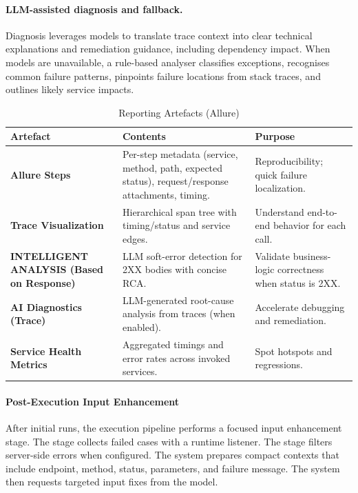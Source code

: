 \documentclass[conference]{IEEEtran}
\begin{document}
\paragraph{LLM-assisted diagnosis and fallback.}
Diagnosis leverages models to translate trace context into clear technical explanations and remediation guidance, including dependency impact. When models are unavailable, a rule-based analyser classifies exceptions, recognises common failure patterns, pinpoints failure locations from stack traces, and outlines likely service impacts.

\begin{table}[t]
\centering
\caption{Reporting Artefacts (Allure)}
\label{tab:reporting-artefacts}
\renewcommand{\arraystretch}{1.15}\setlength{\tabcolsep}{6pt}
\begin{tabularx}{\textwidth}{>{\bfseries}p{} X p{}}
\toprule
Artefact & Contents & Purpose \\
\midrule
Allure Steps & Per-step metadata (service, method, path, expected status), request/response attachments, timing. & Reproducibility; quick failure localization. \\
Trace Visualization & Hierarchical span tree with timing/status and service edges. & Understand end-to-end behavior for each call. \\
INTELLIGENT ANALYSIS (Based on Response) & LLM soft-error detection for 2XX bodies with concise RCA. & Validate business-logic correctness when status is 2XX. \\
AI Diagnostics (Trace) & LLM-generated root-cause analysis from traces (when enabled). & Accelerate debugging and remediation. \\
Service Health Metrics & Aggregated timings and error rates across invoked services. & Spot hotspots and regressions. \\
\bottomrule
\end{tabularx}
\end{table}

\paragraph{Post-Execution Input Enhancement}
After initial runs, the execution pipeline performs a focused input enhancement stage. The stage collects failed cases with a runtime listener. The stage filters server-side errors when configured. The system prepares compact contexts that include endpoint, method, status, parameters, and failure message. The system then requests targeted input fixes from the model.
\end{document}
